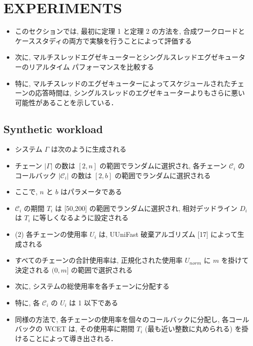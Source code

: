 
\section{EXPERIMENTS}
\label{sec: experiments}


\begin{frame}{}
    \begin{itemize}
        \item このセクションでは, 最初に定理 1 と定理 2 の方法を, 合成ワークロードとケーススタディの両方で実験を行うことによって評価する
\item 次に, マルチスレッドエグゼキューターとシングルスレッドエグゼキューターのリアルタイム パフォーマンスを比較する
\item 特に, マルチスレッドのエグゼキューターによってスケジュールされたチェーンの応答時間は, シングルスレッドのエグゼキューターよりもさらに悪い可能性があることを示している．
    \end{itemize}
\end{frame}


\subsection{Synthetic workload}
\label{ssec: synthetic workload}

\begin{frame}{}
    \begin{itemize}
        \item システム $\Gamma$ は次のように生成される
\item チェーン $|\Gamma|$ の数は $[2, n]$ の範囲でランダムに選択され, 各チェーン $\mathcal{C}_{i}$ のコールバック $\left|\mathcal{C}_{i}\right|$ の数は $[2, b]$ の範囲でランダムに選択される
\item ここで, $n$ と $b$ はパラメータである
\item $\mathcal{C}_{i}$ の期間 $T_{i}$ は [50,200] の範囲でランダムに選択され, 相対デッドライン $D_{i}$ は $T_{i}$ に等しくなるように設定される
\item (2) 各チェーンの使用率 $U_{i}$ は, UUniFast 破棄アルゴリズム [17] によって生成される
\item すべてのチェーンの合計使用率は, 正規化された使用率 $U_{n o r m}$ に $m$ を掛けて決定される $(0, m]$ の範囲で選択される
\item 次に, システムの総使用率を各チェーンに分配する
\item 特に, 各 $\mathcal{C}_{i}$ の $U_{i}$ は 1 以下である
\item 同様の方法で, 各チェーンの使用率を個々のコールバックに分配し, 各コールバックの WCET は, その使用率に期間 $T_{i}$ (最も近い整数に丸められる) を掛けることによって導き出される．
    \end{itemize}
\end{frame}


